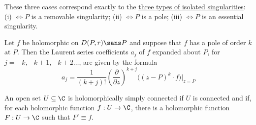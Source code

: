These three cases correspond exactly to the \href{a7f062e}{three types of
isolated singularities}: (i) $\iff P$ is a removable singularity; (ii) $\iff P$
is a pole; (iii) $\iff P$ is an essential singularity.


Let $f$ be holomorphic on $D(P,r)\sans P$ and suppose that $f$ has a pole of
order $k$ at $P$. Then the Laurent series coefficients $a_j$ of $f$ expanded
about $P$, for $j=-k,-k+1,-k+2\ldots$, are given by the formula
$$
  a_j=\frac1{(k+j)!}\left(\frac\partial{\partial z}\right)^{k+j}
  \big((z-P)^k\cdot f\big)\Bigg|_{z=P}
$$


An open set $U\subseteq\C$ is holomorphically simply connected if $U$ is
connected and if, for each holomorphic function $f:U\to\C$, there is a
holomorphic function $F:U\to\C$ such that $F'\equiv f$.
